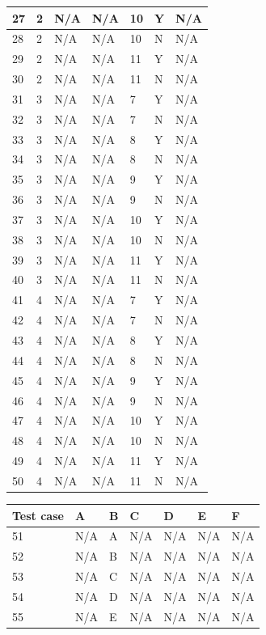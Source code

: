 \documentclass[12pt, letterpaper, titlepage]{article}
\begin{document}
\begin{centering}
\begin{tabularx}{\textwidth}{|X|X|X|X|X|X|X|}
    27 & 2 & N/A & N/A & 10 & Y & N/A \\ \hline
    28 & 2 & N/A & N/A & 10 & N & N/A \\ \hline
    29 & 2 & N/A & N/A & 11 & Y & N/A \\ \hline
    30 & 2 & N/A & N/A & 11 & N & N/A \\ \hline
    31 & 3 & N/A & N/A & 7 & Y & N/A \\ \hline
    32 & 3 & N/A & N/A & 7 & N & N/A \\ \hline
    33 & 3 & N/A & N/A & 8 & Y & N/A \\ \hline
    34 & 3 & N/A & N/A & 8 & N & N/A \\ \hline
    35 & 3 & N/A & N/A & 9 & Y & N/A \\ \hline
    36 & 3 & N/A & N/A & 9 & N & N/A \\ \hline
    37 & 3 & N/A & N/A & 10 & Y & N/A \\ \hline
    38 & 3 & N/A & N/A & 10 & N & N/A \\ \hline
    39 & 3 & N/A & N/A & 11 & Y & N/A \\ \hline
    40 & 3 & N/A & N/A & 11 & N & N/A \\ \hline
    41 & 4 & N/A & N/A & 7 & Y & N/A \\ \hline
    42 & 4 & N/A & N/A & 7 & N & N/A \\ \hline
    43 & 4 & N/A & N/A & 8 & Y & N/A \\ \hline
    44 & 4 & N/A & N/A & 8 & N & N/A \\ \hline
    45 & 4 & N/A & N/A & 9 & Y & N/A \\ \hline
    46 & 4 & N/A & N/A & 9 & N & N/A \\ \hline
    47 & 4 & N/A & N/A & 10 & Y & N/A \\ \hline
    48 & 4 & N/A & N/A & 10 & N & N/A \\ \hline
    49 & 4 & N/A & N/A & 11 & Y & N/A \\ \hline
    50 & 4 & N/A & N/A & 11 & N & N/A \\ \hline
\end{tabularx}

\begin{tabularx}{\textwidth}{|X|X|X|X|X|X|X|}
    \caption{Test cases for output Y} \\ \hline
    \textbf{Test case} & \textbf{A} & \textbf{B} & \textbf{C} & \textbf{D} & \textbf{E} & \textbf{F} \\ \hline
    51 & N/A & A & N/A & N/A & N/A & N/A \\ \hline
    52 & N/A & B & N/A & N/A & N/A & N/A \\ \hline
    53 & N/A & C & N/A & N/A & N/A & N/A \\ \hline
    54 & N/A & D & N/A & N/A & N/A & N/A \\ \hline
    55 & N/A & E & N/A & N/A & N/A & N/A \\ \hline
\end{tabularx}


\end{centering}
\end{document}
